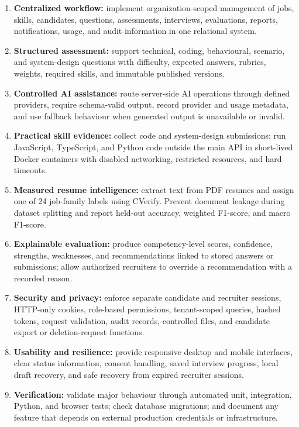 \documentclass[12pt,a4paper,oneside]{report}
\begin{document}
\begin{enumerate}[leftmargin=0.35in,itemsep=4pt]
\item \textbf{Centralized workflow:} implement organization-scoped management of jobs,
skills, candidates, questions, assessments, interviews, evaluations, reports,
notifications, usage, and audit information in one relational system.

\item \textbf{Structured assessment:} support technical, coding, behavioural,
scenario, and system-design questions with difficulty, expected answers, rubrics,
weights, required skills, and immutable published versions.

\item \textbf{Controlled AI assistance:} route server-side AI operations through
defined providers, require schema-valid output, record provider and usage metadata,
and use fallback behaviour when generated output is unavailable or invalid.

\item \textbf{Practical skill evidence:} collect code and system-design submissions;
run JavaScript, TypeScript, and Python code outside the main API in short-lived Docker
containers with disabled networking, restricted resources, and hard timeouts.

\item \textbf{Measured resume intelligence:} extract text from PDF resumes and assign
one of 24 job-family labels using CVerify. Prevent document leakage during dataset
splitting and report held-out accuracy, weighted F1-score, and macro F1-score.

\item \textbf{Explainable evaluation:} produce competency-level scores, confidence,
strengths, weaknesses, and recommendations linked to stored answers or submissions;
allow authorized recruiters to override a recommendation with a recorded reason.

\item \textbf{Security and privacy:} enforce separate candidate and recruiter
sessions, HTTP-only cookies, role-based permissions, tenant-scoped queries, hashed
tokens, request validation, audit records, controlled files, and candidate export or
deletion-request functions.

\item \textbf{Usability and resilience:} provide responsive desktop and mobile
interfaces, clear status information, consent handling, saved interview progress,
local draft recovery, and safe recovery from expired recruiter sessions.

\item \textbf{Verification:} validate major behaviour through automated unit,
integration, Python, and browser tests; check database migrations; and document any
feature that depends on external production credentials or infrastructure.
\end{enumerate}
\end{document}
